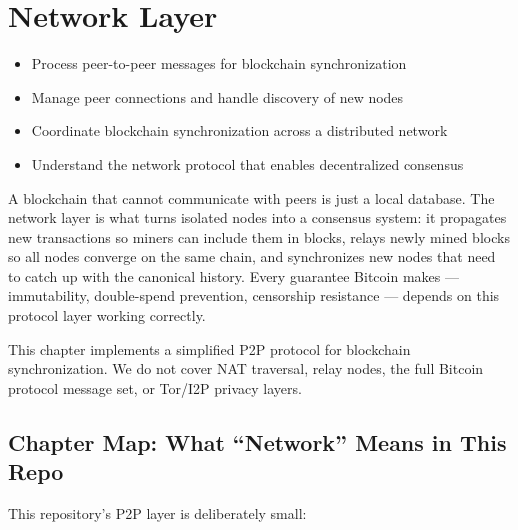 \chapter{Network Layer}
\label{ch:network}

\begin{learnbox}
\begin{itemize}
  \item Process peer-to-peer messages for blockchain synchronization
  \item Manage peer connections and handle discovery of new nodes
  \item Coordinate blockchain synchronization across a distributed network
  \item Understand the network protocol that enables decentralized consensus
\end{itemize}
\end{learnbox}

\lettrine{A}{} blockchain that cannot communicate with peers is just a local database. The network layer is what turns isolated nodes into a consensus system: it propagates new transactions so miners can include them in blocks, relays newly mined blocks so all nodes converge on the same chain, and synchronizes new nodes that need to catch up with the canonical history. Every guarantee Bitcoin makes --- immutability, double-spend prevention, censorship resistance --- depends on this protocol layer working correctly.

\begin{notebox}[Scope]
This chapter implements a simplified P2P protocol for blockchain synchronization. We do not cover NAT traversal, relay nodes, the full Bitcoin protocol message set, or Tor/I2P privacy layers.
\end{notebox}

\section{Chapter Map: What ``Network'' Means in This Repo}
\label{sec:ch12-chapter-map}

This repository's P2P layer is deliberately small:

